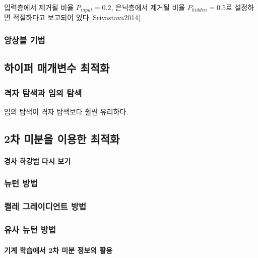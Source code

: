 \documentclass [12pt] {oblivoir}
\let\oldsubsubsection=\subsubsection
\renewcommand{\subsubsection}
{
  \filbreak
  \oldsubsubsection
}
\begin{document}
입력층에서 제거될 비율 $P_{input} = 0.2$, 은닉층에서 제거될 비율 $P_{hidden} = 0.5$로 설정하면 적절하다고 보고되어 있다.[Srivastava2014]

\subsubsection{앙상블 기법}

\subsection{하이퍼 매개변수 최적화}

\subsubsection{격자 탐색과 임의 탐색}

임의 탐색이 격자 탐색보다 훨씬 유리하다.

\subsection{2차 미분을 이용한 최적화}

\paragraph*{경사 하강법 다시 보기}\mbox{}

\vspace{3mm}

\subsubsection{뉴턴 방법}

\subsubsection{켤레 그레이디언트 방법}

\subsubsection{유사 뉴턴 방법}

\paragraph*{기계 학습에서 2차 미분 정보의 활용}\mbox{}

\vspace{3mm}

\newpage
\end{document}
